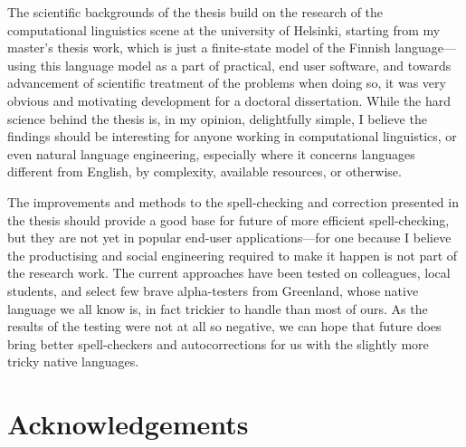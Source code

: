 \documentclass[officiallayout]{unihelcompling}
\begin{document}
The scientific backgrounds of the thesis build on the research of the
computational linguistics scene at the university of Helsinki, starting from my
master's thesis work, which is just a finite-state model of the Finnish
language---using this language model as a part of practical, end
user software, and towards advancement of scientific treatment of the problems
when doing so, it was very obvious and motivating development for a doctoral
dissertation. While the hard science behind the thesis is, in my opinion,
delightfully simple, I believe the findings should be interesting for anyone
working in computational linguistics, or even natural language engineering,
especially where it concerns languages different from English, by complexity,
available resources, or otherwise.

The improvements and methods to the spell-checking and correction presented in
the thesis should provide a good base for future of more efficient
spell-checking, but they are not yet in popular end-user applications---for one
because I believe the productising and social engineering required to make it
happen is not part of the research work. The current approaches have been
tested on colleagues, local students, and select few brave alpha-testers from
Greenland, whose native language we all know is, in fact trickier to handle
than most of ours. As the results of the testing were not at all so negative,
we can hope that future does bring better spell-checkers and autocorrections
for us with the slightly more tricky native languages.

\section*{Acknowledgements}
\label{sec:acknowledgements}
\end{document}
